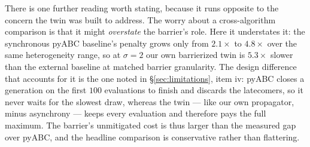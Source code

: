 There is one further reading worth stating, because it runs opposite to the concern the twin was built to address. The worry about a cross-algorithm comparison is that it might \emph{overstate} the barrier's role. Here it understates it: the synchronous pyABC baseline's penalty grows only from $2.1\times$ to $4.8\times$ over the same heterogeneity range, so at $\sigma{=}2$ our own barrierized twin is $5.3\times$ slower than the external baseline at matched barrier granularity. The design difference that accounts for it is the one noted in \S\ref{sec:limitations}, item iv: pyABC closes a generation on the first $100$ evaluations to finish and discards the latecomers, so it never waits for the slowest draw, whereas the twin --- like our own propagator, minus asynchrony --- keeps every evaluation and therefore pays the full maximum. The barrier's unmitigated cost is thus larger than the measured gap over pyABC, and the headline comparison is conservative rather than flattering.

